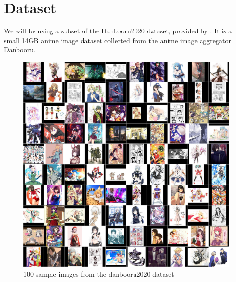 \documentclass{article}
\begin{document}
\section{Dataset}
We will be using a subset of the \href{https://gwern.net/danbooru2021#danbooru2020}{Danbooru2020} \cite{danbooru2021} dataset, provided by \cite{danbooru2020small}. It is a small 14GB anime image dataset collected from the anime image aggregator Danbooru.\\

\begin{figure}[h!]
\centering
\includegraphics[scale=0.1]{danbooru2020-512px-samples.jpg}
\caption{100 sample images from the danbooru2020 dataset}
\end{figure}
\end{document}
